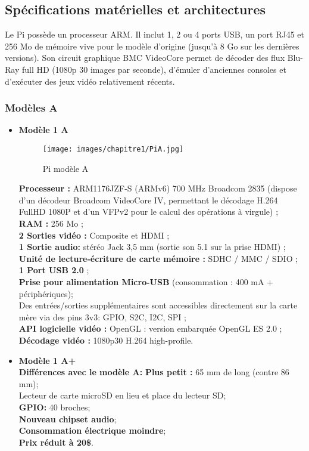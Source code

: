 \documentclass[12pt,a4paper,oneside]{book}
\begin{document}
	\subsection{Spécifications matérielles et architectures}
	Le Pi possède un processeur ARM. Il inclut 1, 2 ou 4 ports USB, un port RJ45 et 256 Mo de mémoire vive pour le modèle d'origine (jusqu'à 8 Go sur les dernières versions). Son circuit graphique BMC VideoCore permet de décoder des flux Blu-Ray full HD (1080p 30 images par seconde), d'émuler d’anciennes consoles et d'exécuter des jeux vidéo relativement récents.
	
	\subsubsection{Modèles A}
	\begin{itemize}
		\item \textbf{Modèle 1 A}\\
	\begin{figure}[H]
		\begin{center}
			\texttt{[image: images/chapitre1/PiA.jpg]}
			\caption{Pi modèle A}
			\label{Types}
		\end{center}
	\end{figure}
	
	\textbf{Processeur :} ARM1176JZF-S (ARMv6) 700 MHz Broadcom 2835 (dispose d'un décodeur Broadcom VideoCore IV, permettant le décodage H.264 FullHD 1080P et d'un VFPv2 pour le calcul des opérations à virgule) ;\\
	\textbf{RAM :} 256 Mo ;\\
	\textbf{2 Sorties vidéo :} Composite et HDMI ;\\
	\textbf{1 Sortie audio:} stéréo Jack 3,5 mm (sortie son 5.1 sur la prise HDMI) ;\\
	\textbf{Unité de lecture-écriture de carte mémoire :} SDHC / MMC / SDIO ;\\
	\textbf{1 Port USB 2.0} ;\\
	\textbf{Prise pour alimentation Micro-USB} (consommation : 400 mA + périphériques);\\
	Des entrées/sorties supplémentaires sont accessibles directement sur la carte mère via des pins 3v3: GPIO, S2C, I2C, SPI ;\\
	\textbf{API logicielle vidéo :} OpenGL : version embarquée OpenGL ES 2.0 ;\\
	\textbf{Décodage vidéo :} 1080p30 H.264 high-profile.\\
	
	\item \textbf{Modèle 1 A+ }\\
	\textbf{Différences avec le modèle A:}
	\textbf{Plus petit :} 65 mm de long (contre 86 mm);\\
	Lecteur de carte microSD en lieu et place du lecteur SD;\\
	\textbf{GPIO:} 40 broches;\\
	\textbf{Nouveau chipset audio};\\
	\textbf{Consommation électrique moindre};\\
	\textbf{Prix réduit à 20\$}.\\
	\end{itemize}
	
\end{document}
